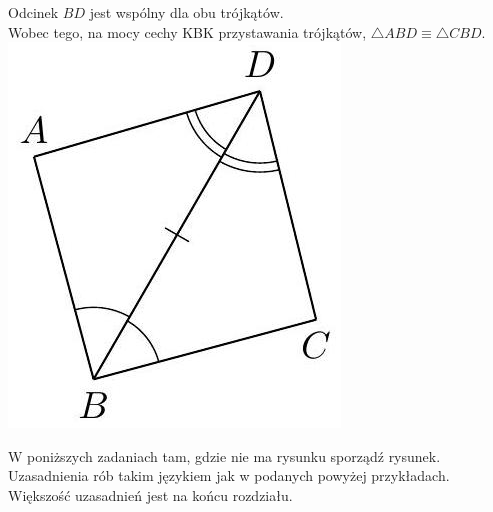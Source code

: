 \documentclass[10pt]{article}
\begin{document}
Odcinek \(B D\) jest wspólny dla obu trójkątów.\\
Wobec tego, na mocy cechy KBK przystawania trójkątów, \(\triangle A B D \equiv \triangle C B D\).\\
\includegraphics[max width=\textwidth, center]{2024_11_21_71f62bd117d375398909g-048(1)}

W poniższych zadaniach tam, gdzie nie ma rysunku sporządź rysunek. Uzasadnienia rób takim językiem jak w podanych powyżej przykładach.\\
Większość uzasadnień jest na końcu rozdziału.
\end{document}
